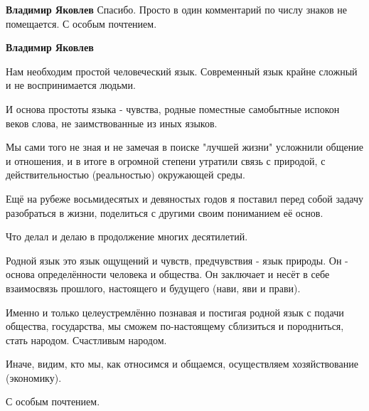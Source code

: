 \begin{itemize}
\begin{itemize}
\textbf{Владимир Яковлев} Спасибо.
Просто в один комментарий по числу знаков не помещается.
С особым почтением.

\textbf{Владимир Яковлев} 

Нам необходим простой человеческий язык. Современный язык крайне сложный и не
воспринимается людьми.

И основа простоты языка - чувства, родные поместные самобытные испокон веков
слова, не заимствованные из иных языков.

Мы сами того не зная и не замечая в поиске "лучшей жизни" усложнили общение и
отношения, и в итоге в огромной степени утратили связь с природой, с
действительностью (реальностью) окружающей среды.

Ещё на рубеже восьмидесятых и девяностых годов я поставил перед собой задачу
разобраться в жизни, поделиться с другими своим пониманием её основ.

Что делал и делаю в продолжение многих десятилетий.

Родной язык это язык ощущений и чувств, предчувствия - язык природы. Он -
основа определённости человека и общества. Он заключает и несёт в себе
взаимосвязь прошлого, настоящего и будущего (нави, яви и прави).

Именно и только целеустремлённо познавая и постигая родной язык с подачи
общества, государства, мы сможем по-настоящему сблизиться и породниться, стать
народом. Счастливым народом.

Иначе, видим, кто мы, как относимся и общаемся, осуществляем хозяйствование
(экономику).

С особым почтением.
\end{itemize} %

\end{itemize} %
